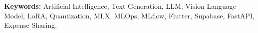 \noindent\textbf{Keywords:} Artificial Intelligence, Text Generation, LLM,
Vision-Language Model, LoRA, Quantization, MLX, MLOps, MLflow, Flutter, Supabase,
FastAPI, Expense Sharing.

\clearpage
{}
{}
{\tableofcontents}

\clearpage
{}
{}
{\listoffigures}

\clearpage
{}
{}
{\listoftables}


